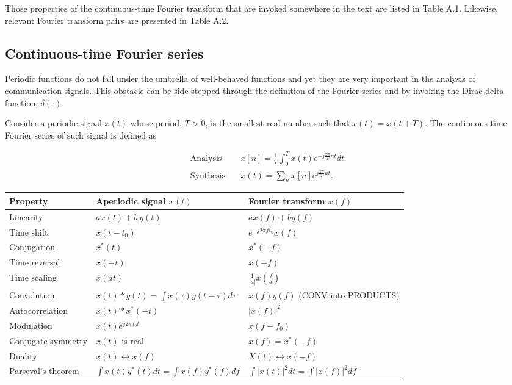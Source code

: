 \documentclass[a4paper, 12pt]{book}
\begin{document}
Those properties of the continuous-time Fourier transform that are invoked somewhere in the text are listed in Table A.1. Likewise, relevant Fourier transform pairs are presented in Table A.2.

\subsection{Continuous-time Fourier series}

Periodic functions do not fall under the umbrella of well-behaved functions and yet they are very important in the analysis of communication signals. This obstacle can be side-stepped through the definition of the Fourier series and by invoking the Dirac delta function, $\delta(\cdot)$.

Consider a periodic signal $x(t)$ whose period, $T>0$, is the smallest real number such that $x(t)=x(t+T)$. The continuous-time Fourier series of such signal is defined as

\begin{align}
    \text{Analysis} \quad & x[n]=\frac{1}{T}\int_{0}^{T}x(t)e^{-j\frac{2\pi}{T}nt}dt \tag{A.3} \\
    \text{Synthesis} \quad & x(t)=\sum_{n}x[n]e^{j\frac{2\pi}{T}nt}. \tag{A.4}
\end{align}

\begin{yellowbox}
\begin{center}
\small
\begin{tabular}{@{}lll@{}}
\toprule
\textbf{Property} & \textbf{Aperiodic signal} $x(t)$ & \textbf{Fourier transform} $x(f)$ \\ \midrule
Linearity & $ax(t)+b~y(t)$ & $ax(f)+by(f)$ \\
Time shift & $x(t-t_{0})$ & $e^{-j2\pi ft_{0}}x(f)$ \\
Conjugation & $x^{*}(t)$ & $x^{*}(-f)$ \\
Time reversal & $x(-t)$ & $x(-f)$ \\
Time scaling & $x(at)$ & $\frac{1}{|a|}x(\frac{f}{a})$ \\
Convolution & $x(t)*y(t)=\int x(\tau)y(t-\tau)d\tau$ & $x(f)y(f)$ (CONV into PRODUCTS) \\
Autocorrelation & $x(t)*x^{*}(-t)$ & $|x(f)|^{2}$ \\
Modulation & $x(t)e^{j2\pi f_0 t}$ & $x(f-f_{0})$ \\
Conjugate symmetry & $x(t)$ is real & $x(f)=x^{*}(-f)$ \\
Duality & $x(t) \leftrightarrow x(f)$ & $X(t) \leftrightarrow x(-f)$ \\
Parseval's theorem & $\int x(t)y^{*}(t)dt = \int x(f)y^{*}(f)df$ & $\int |x(t)|^{2} dt = \int |x(f)|^{2} df$ \\ \bottomrule
\end{tabular}
\end{center}
\end{yellowbox}
\end{document}
